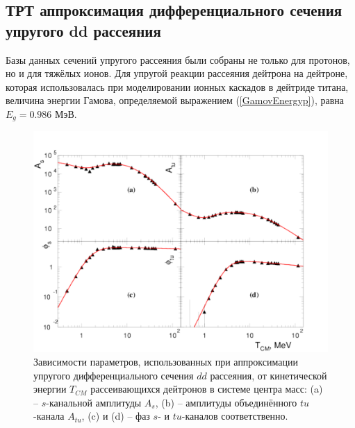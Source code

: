 \documentclass[a4paper,12pt]{article}
\begin{document}
\begin{large}
\subsection{ТРТ аппроксимация дифференциального сечения упругого dd рассеяния}
\label{subPol1}

  Базы данных сечений упругого рассеяния были собраны не только для протонов, но и для тяжёлых ионов.
  Для упругой реакции рассеяния дейтрона на дейтроне, которая использовалась при моделировании ионных каскадов в дейтриде титана, величина энергии Гамова, определяемой выражением (\ref{GamovEnergyp}), равна $E_g=0.986$ МэВ.

\begin{figure}[ht]
   \centering
   \includegraphics[width=0.95\linewidth]{images/4parfit}
   \caption{Зависимости параметров, использованных при аппроксимации упругого дифференциального сечения $dd$ рассеяния, от кинетической энергии $T_{CM}$ рассеивающихся дейтронов в системе центра масс: (a) -- $s$-канальной амплитуды $A_s$, (b) -- амплитуды объединённого $tu$-канала $A_{tu}$, (c) и (d) -- фаз $s$- и $tu$-каналов соответственно.} 
   \label{fig:4parfit_dd}
\end{figure}


\end{large}
\end{document}
